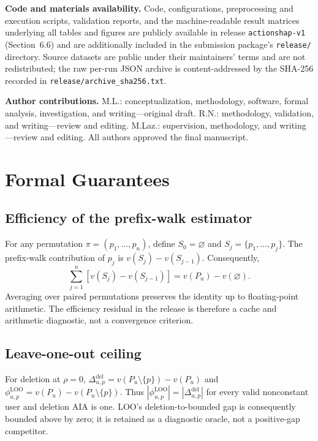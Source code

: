 \documentclass[pdflatex,sn-mathphys-num]{sn-jnl}
\theoremstyle{thmstyleone}
\theoremstyle{thmstyletwo}
\theoremstyle{thmstylethree}
\begin{document}
\textbf{Code and materials availability.} Code, configurations, preprocessing and execution scripts, validation reports, and the machine-readable result matrices underlying all tables and figures are publicly available in release \texttt{actionshap-v1} (Section~6.6) and are additionally included in the submission package's \texttt{release/} directory. Source datasets are public under their maintainers' terms and are not redistributed; the raw per-run JSON archive is content-addressed by the SHA-256 recorded in \texttt{release/archive\_sha256.txt}.

\textbf{Author contributions.} M.L.: conceptualization, methodology, software, formal analysis, investigation, and writing---original draft. R.N.: methodology, validation, and writing---review and editing. M.Laz.: supervision, methodology, and writing---review and editing. All authors approved the final manuscript.


\appendix
\setcounter{section}{0}
\renewcommand{\thesection}{\Alph{section}}
\renewcommand{\thesubsection}{\thesection.\arabic{subsection}}
\renewcommand{\thetable}{\thesection\arabic{table}}
\renewcommand{\theequation}{\thesection\arabic{equation}}
\setcounter{table}{0}
\setcounter{equation}{0}
\section{Formal Guarantees}\label{app:proofs}

\subsection{Efficiency of the prefix-walk estimator}
For any permutation $\pi=(p_1,\ldots,p_n)$, define $S_0=\varnothing$ and $S_j=\{p_1,\ldots,p_j\}$. The prefix-walk contribution of $p_j$ is $v(S_j)-v(S_{j-1})$. Consequently,
\begin{equation}
\sum_{j=1}^{n}\left[v(S_j)-v(S_{j-1})\right]=v(P_u)-v(\varnothing).
\end{equation}
Averaging over paired permutations preserves the identity up to floating-point arithmetic. The efficiency residual in the release is therefore a cache and arithmetic diagnostic, not a convergence criterion.

\subsection{Leave-one-out ceiling}
For deletion at $\rho=0$, $\Delta^{\mathrm{del}}_{u,p}=v(P_u\setminus\{p\})-v(P_u)$ and $\phi^{\mathrm{LOO}}_{u,p}=v(P_u)-v(P_u\setminus\{p\})$. Thus $|\phi^{\mathrm{LOO}}_{u,p}|=|\Delta^{\mathrm{del}}_{u,p}|$ for every valid nonconstant user and deletion AIA is one. LOO's deletion-to-bounded gap is consequently bounded above by zero; it is retained as a diagnostic oracle, not a positive-gap competitor.
\end{document}
